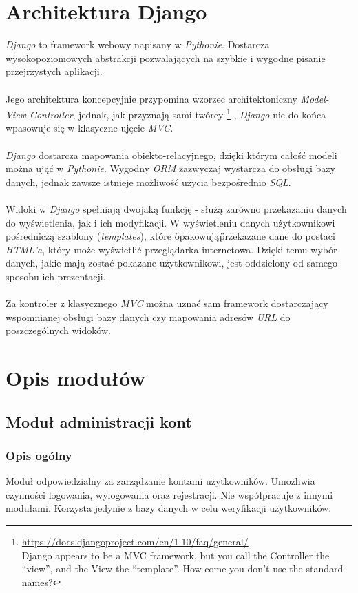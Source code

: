 \documentclass[pdflatex,11pt]{../aghdoc_version2}
\begin{document}
\chapter{Architektura Django}
\textit{Django} to framework webowy napisany w \textit{Pythonie}. Dostarcza wysokopoziomowych
abstrakcji pozwalających na szybkie i wygodne pisanie przejrzystych aplikacji. \\ \\
Jego architektura koncepcyjnie przypomina wzorzec architektoniczny \textit{Model-View-Controller},
jednak, jak przyznają sami twórcy
\footnote{\url{https://docs.djangoproject.com/en/1.10/faq/general/}{\\Django appears to be a MVC framework, but you call the Controller the “view”, and the View the “template”. How come you don’t use the standard names?}}
, \textit{Django} nie do końca wpasowuje się w klasyczne
ujęcie \textit{MVC}. \\ \\
\textit{Django} dostarcza mapowania obiekto-relacyjnego, dzięki którym całość modeli można ująć
w \textit{Pythonie}. Wygodny \textit{ORM} zazwyczaj wystarcza do obsługi bazy danych, jednak zawsze
istnieje możliwość użycia bezpośrednio \textit{SQL}. \\ \\
Widoki w \textit{Django} spełniają dwojaką funkcję - służą zarówno przekazaniu danych do
wyświetlenia, jak i ich modyfikacji. W wyświetleniu danych użytkownikowi pośredniczą
szablony (\textit{templates}), które \"opakowują\" przekazane dane do postaci \textit{HTML'a}, który może wyświetlić przeglądarka internetowa. Dzięki temu wybór danych, jakie mają zostać pokazane
użytkownikowi, jest oddzielony od samego sposobu ich prezentacji. \\ \\
Za kontroler z klasycznego \textit{MVC} można uznać sam framework dostarczający wspomnianej
obsługi bazy danych czy mapowania adresów \textit{URL} do poszczególnych widoków.

\chapter{Opis modułów}
\label{cha:opis_modulow}

\section{Moduł administracji kont}
\subsection{Opis ogólny}
Moduł odpowiedzialny za zarządzanie kontami użytkowników. Umożliwia czynności
logowania, wylogowania oraz rejestracji. Nie współpracuje z innymi modułami. Korzysta
jedynie z bazy danych w celu weryfikacji użytkowników.
\end{document}

